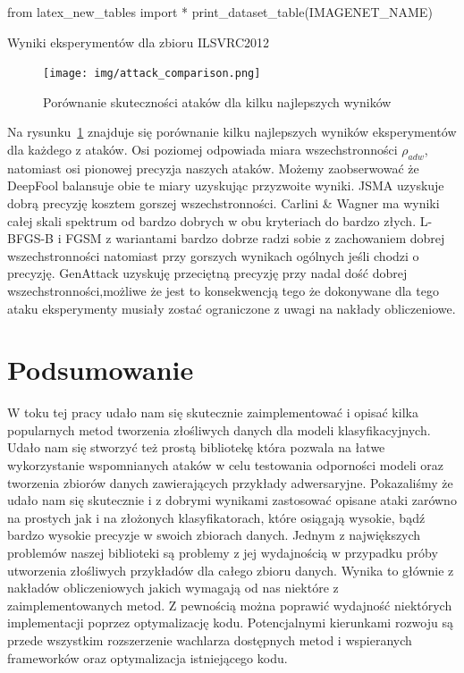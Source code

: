 \documentclass[
    left=2.5cm,         %
    right=2.5cm,        %
    top=2.5cm,          %
    bottom=3cm,         %
    bindingoffset=6mm,  %
    nohyphenation=false %
]{eiti/eiti-thesis}
\begin{document}
\begin{table}[H]
\begin{adjustbox}{max width=\textwidth}
\begin{pycode}
from latex_new_tables import *
print_dataset_table(IMAGENET_NAME)
\end{pycode}
\end{adjustbox}
\caption{Wyniki eksperymentów dla zbioru ILSVRC2012}
\end{table}

\begin{figure}[H]
    \texttt{[image: img/attack\_comparison.png]}
    \caption{Porównanie skuteczności ataków dla kilku najlepszych wyników}
    \label{fig:attack_comparison_plot}
    \hfill
\end{figure}

Na rysunku~\ref{fig:attack_comparison_plot} znajduje się porównanie kilku najlepszych wyników eksperymentów dla każdego z ataków.
Osi poziomej odpowiada miara wszechstronności $\rho_{adw}$, natomiast osi pionowej precyzja naszych ataków.
Możemy zaobserwować że DeepFool balansuje obie te miary uzyskując przyzwoite wyniki.
JSMA uzyskuje dobrą precyzję kosztem gorszej wszechstronności.
Carlini & Wagner ma wyniki całej skali spektrum od bardzo dobrych w obu kryteriach do bardzo złych.
L-BFGS-B i FGSM z wariantami bardzo dobrze radzi sobie z zachowaniem dobrej wszechstronności natomiast
przy gorszych wynikach ogólnych jeśli chodzi o precyzję.
GenAttack uzyskuję przeciętną precyzję przy nadal dość dobrej wszechstronności,możliwe że jest to konsekwencją tego że dokonywane dla tego ataku eksperymenty musiały zostać ograniczone z uwagi na nakłady obliczeniowe.



\newpage

\section{Podsumowanie}
W toku tej pracy udało nam się skutecznie zaimplementować i opisać kilka popularnych metod tworzenia złośliwych danych
dla modeli klasyfikacyjnych. Udało nam się stworzyć też prostą bibliotekę która pozwala na łatwe wykorzystanie wspomnianych ataków w celu
testowania odporności modeli oraz tworzenia zbiorów danych zawierających przykłady adwersaryjne.
Pokazaliśmy że udało nam się skutecznie i z dobrymi wynikami zastosować opisane ataki zarówno na prostych
jak i na złożonych klasyfikatorach, które osiągają wysokie, bądź bardzo wysokie precyzje w swoich zbiorach danych.
Jednym z największych problemów naszej biblioteki są problemy z jej wydajnością w przypadku próby utworzenia złośliwych przykładów dla całego zbioru danych.
Wynika to głównie z nakładów obliczeniowych jakich wymagają od nas niektóre z zaimplementowanych metod.
Z pewnością można poprawić wydajność niektórych implementacji poprzez optymalizację kodu.
Potencjalnymi kierunkami rozwoju są przede wszystkim rozszerzenie wachlarza dostępnych metod i wspieranych frameworków oraz optymalizacja istniejącego kodu.
\end{document}
